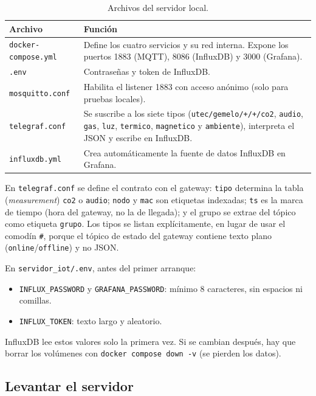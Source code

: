 \documentclass[11pt,a4paper]{article}
\newcommand{\arch}[1]{\texttt{#1}}
\begin{document}
\begin{table}[H]
\centering
\caption{Archivos del servidor local.}
\begin{tabularx}{\textwidth}{@{}lX@{}}
\toprule
\textbf{Archivo} & \textbf{Funci\'on} \\
\midrule
\arch{docker-compose.yml} & Define los cuatro servicios y su red interna. Expone los puertos
1883 (MQTT), 8086 (InfluxDB) y 3000 (Grafana). \\
\arch{.env} & Contrase\~nas y token de InfluxDB. \\
\arch{mosquitto.conf} & Habilita el listener 1883 con acceso an\'onimo (solo para pruebas
locales). \\
\arch{telegraf.conf} & Se suscribe a los siete tipos (\texttt{utec/gemelo/+/+/co2},
\texttt{audio}, \texttt{gas}, \texttt{luz}, \texttt{termico}, \texttt{magnetico} y \texttt{ambiente}),
interpreta el JSON y escribe en InfluxDB. \\
\arch{influxdb.yml} & Crea autom\'aticamente la fuente de datos InfluxDB en Grafana. \\
\bottomrule
\end{tabularx}
\end{table}

En \arch{telegraf.conf} se define el contrato con el gateway: \texttt{tipo} determina la
tabla (\emph{measurement}) \texttt{co2} o \texttt{audio}; \texttt{nodo} y \texttt{mac} son
etiquetas indexadas; \texttt{ts} es la marca de tiempo (hora del gateway, no la de
llegada); y el grupo se extrae del t\'opico como etiqueta \texttt{grupo}. Los tipos se listan
expl\'icitamente, en lugar de usar el comod\'in \texttt{\#}, porque el t\'opico de estado del gateway
contiene texto plano (\texttt{online}/\texttt{offline}) y no JSON.

\begin{completar}
En \arch{servidor\_iot/.env}, antes del primer arranque:
\begin{itemize}
  \item \texttt{INFLUX\_PASSWORD} y \texttt{GRAFANA\_PASSWORD}: m\'inimo 8 caracteres, sin
        espacios ni comillas.
  \item \texttt{INFLUX\_TOKEN}: texto largo y aleatorio.
\end{itemize}
InfluxDB lee estos valores solo la primera vez. Si se cambian despu\'es, hay que borrar los
vol\'umenes con \texttt{docker compose down -v} (se pierden los datos).
\end{completar}

\subsection{Levantar el servidor}
\end{document}
